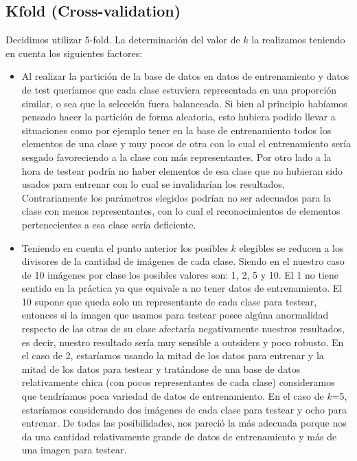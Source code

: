 \subsection*{Kfold (Cross-validation)}
Decidimos utilizar 5-fold.
La determinación del valor de $k$ la realizamos teniendo en cuenta los siguientes factores:
\begin{itemize}
\item Al realizar la partición de la base de datos en datos de entrenamiento y datos de test queríamos que cada clase estuviera representada en una proporción similar, o sea que la selección fuera balanceada. Si bien al principio habíamos pensado hacer la partición de forma aleatoria, esto hubiera podido llevar a situaciones como por ejemplo tener en la base de entrenamiento todos los elementos de una clase y muy pocos de otra con lo cual el entrenamiento sería sesgado favoreciendo a la clase con más representantes. Por otro lado a la hora de testear podría no haber elementos de esa clase que no hubieran sido usados para entrenar con lo cual se invalidarían los resultados. Contrariamente los parámetros elegidos podrían no ser adecuados para la clase con menos representantes, con lo cual el reconocimientos de elementos pertenecientes a esa clase sería deficiente.

\item Teniendo en cuenta el punto anterior los posibles $k$ elegibles se reducen a los divisores de la cantidad de imágenes de cada clase. Siendo en el nuestro caso de 10 imágenes por clase los posibles valores son: 1, 2, 5 y 10. El 1 no tiene sentido en la práctica ya que equivale a no tener datos de entrenamiento. El 10 supone que queda solo un representante de cada clase para testear, entonces si la imagen que usamos para testear posee algúna anormalidad respecto de las otras de su clase afectaría negativamente nuestros resultados, es decir, nuestro resultado sería muy sensible a outsiders y poco robusto. En el caso de 2, estaríamos usando la mitad de los datos para entrenar y la mitad de los datos para testear y tratándose de una base de datos relativamente chica (con pocos representantes de cada clase) consideramos que tendríamos poca variedad de datos de entrenamiento. En el caso de $k$=5, estaríamos considerando dos imágenes de cada clase para testear y ocho para entrenar. De todas las posibilidades, nos pareció la más adecuada porque nos da una cantidad relativamente grande de datos de entrenamiento y más de una imagen para testear. 
\end{itemize}

